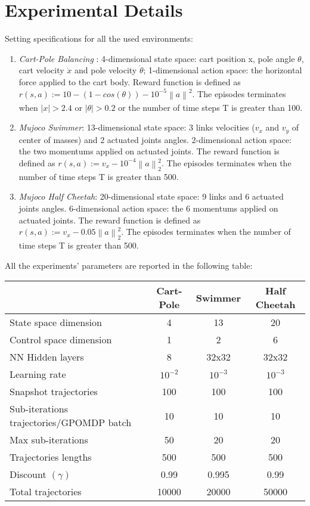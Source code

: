 \documentclass{article}
\theoremstyle{remark}
\theoremstyle{definition}
\newcommand{\norm}[2][\infty]{\left\|#2\right\|_{#1}}
\begin{document}
\section{Experimental Details}\label{app:exp}
Setting specifications for all the used environments:
\begin{enumerate}
	\item \emph{Cart-Pole Balancing} : 4-dimensional state space: cart position x, pole angle $\theta$, cart velocity $\dot{x}$ and pole velocity $\dot{\theta}$; 1-dimensional action space: the horizontal force applied to the cart body. Reward function  is defined as $r(s, a) := 10 - (1 - cos(\theta)) - 10^{-5}\norm[] a^2$. The episodes terminates when $|x|>2.4$ or $|\theta|>0.2$ or the number of time steps T is greater than 100.
	\item \emph{Mujoco Swimmer}: 13-dimensional state space: 3 links velocities ($v_x$ and $v_y$ of center of masses) and 2 actuated joints angles. 2-dimensional action space: the two momentums applied on actuated joints.  The reward function is defined as $r(s, a) := v_x - 10^{-4}\norm[2] a^2$. The episodes terminates when the number of time steps T is greater than 500.
	\item \emph{Mujoco Half Cheetah}: 20-dimensional state space: 9 links and 6 actuated joints angles. 6-dimensional action space: the 6 momentums applied on actuated joints.  The reward function is defined as $r(s, a) := v_x - 0.05\norm[2] a^2$. The episodes terminates when the number of time steps T is greater than 500.
\end{enumerate}

All the experiments' parameters are reported in the following table:

\centering
\begin{tabular}{| l | c  c  c |}
	\hline	
	& Cart-Pole & Swimmer & Half Cheetah \\
	\hline
	State space dimension  & 4 & 13 & 20 \\
	Control space dimension & 1 & 2 & 6 \\
	NN Hidden layers & 8 & 32x32 & 32x32 \\
	Learning rate & $10^{-2}$ & $10^{-3}$ & $10^{-3}$ \\
	Snapshot trajectories & 100 & 100 & 100 \\
	Sub-iterations trajectories/GPOMDP batch & 10 & 10 & 10 \\
	Max sub-iterations & 50 & 20 & 20 \\
	Trajectories lengths& 500 & 500 & 500 \\
	Discount $(\gamma)$& 0.99 & 0.995 & 0.99 \\
	Total trajectories& 10000 & 20000 & 50000 \\
	\hline  
\end{tabular}
\end{document}
